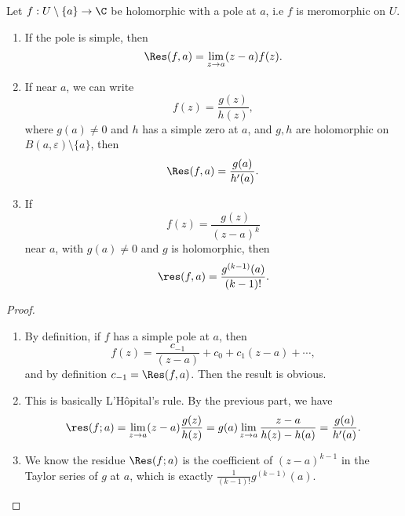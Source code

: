 \documentclass[a4paper]{article}
\begin{document}
\begin{lemma}
  Let $f: U \setminus \{a\} \to \C$ be holomorphic with a pole at $a$, i.e $f$ is meromorphic on $U$.
  \begin{enumerate}
    \item If the pole is simple, then
      \[
        \Res(f, a) = \lim_{z \to a} (z - a) f(z).
      \]
    \item If near $a$, we can write
      \[
        f(z) = \frac{g(z)}{h(z)},
      \]
      where $g(a) \not= 0$ and $h$ has a simple zero at $a$, and $g, h$ are holomorphic on $B(a, \varepsilon) \setminus \{a\}$, then
      \[
        \Res(f, a) = \frac{g(a)}{h'(a)}.
      \]
    \item If
      \[
        f(z) = \frac{g(z)}{(z - a)^k}
      \]
      near $a$, with $g(a) \not= 0$ and $g$ is holomorphic, then
      \[
        \res(f, a) = \frac{g^{(k - 1)}(a)}{(k - 1)!}.
      \]
  \end{enumerate}
\end{lemma}

\begin{proof}\leavevmode
  \begin{enumerate}
    \item By definition, if $f$ has a simple pole at $a$, then
      \[
        f(z) = \frac{c_{-1}}{(z - a)} + c_0 + c_1(z - a) + \cdots,
      \]
      and by definition $c_{-1} = \Res(f, a)$. Then the result is obvious.
    \item This is basically L'H\^opital's rule. By the previous part, we have
      \[
        \res(f; a) = \lim_{z \to a} (z - a)\frac{g(z)}{h(z)} = g(a) \lim_{z \to a} \frac{z - a}{h(z) - h(a)} = \frac{g(a)}{h'(a)}.
      \]
    \item We know the residue $\Res(f; a)$ is the coefficient of $(z - a)^{k - 1}$ in the Taylor series of $g$ at $a$, which is exactly $\frac{1}{(k - 1)!} g^{(k - 1)}(a)$.
  \end{enumerate}
\end{proof}
\end{document}
